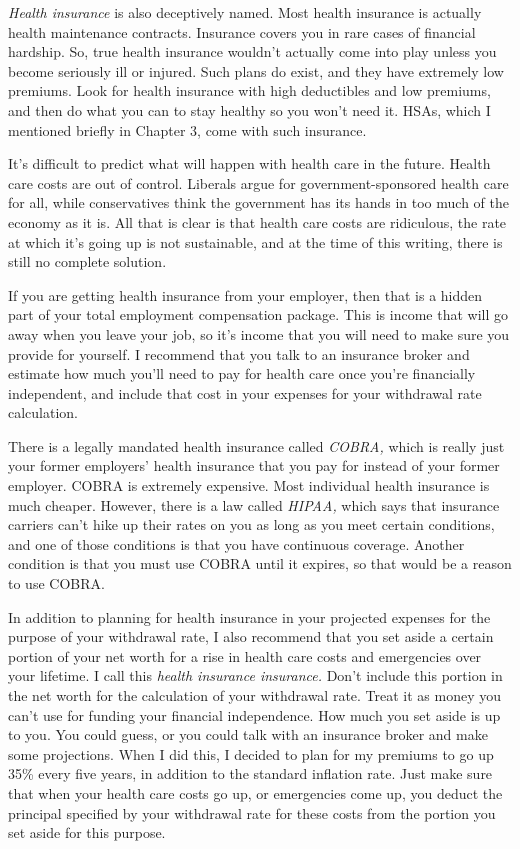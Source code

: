 \emph{Health insurance} is also deceptively named. Most health insurance is actually health maintenance contracts. Insurance covers you in rare cases of financial hardship. So, true health insurance wouldn't actually come into play unless you become seriously ill or injured. Such plans do exist, and they have extremely low premiums. Look for health insurance with high deductibles and low premiums, and then do what you can to stay healthy so you won't need it. HSAs, which I mentioned briefly in Chapter 3, come with such insurance.

It's difficult to predict what will happen with health care in the future. Health care costs are out of control. Liberals argue for government-sponsored health care for all, while conservatives think the government has its hands in too much of the economy as it is. All that is clear is that health care costs are ridiculous, the rate at which it's going up is not sustainable, and at the time of this writing, there is still no complete solution.

If you are getting health insurance from your employer, then that is a hidden part of your total employment compensation package. This is income that will go away when you leave your job, so it's income that you will need to make sure you provide for yourself. I recommend that you talk to an insurance broker and estimate how much you'll need to pay for health care once you're financially independent, and include that cost in your expenses for your withdrawal rate calculation.

There is a legally mandated health insurance called \emph{COBRA,} which is really just your former employers' health insurance that you pay for instead of your former employer. COBRA is extremely expensive. Most individual health insurance is much cheaper. However, there is a law called \emph{HIPAA,} which says that insurance carriers can't hike up their rates on you as long as you meet certain conditions, and one of those conditions is that you have continuous coverage. Another condition is that you must use COBRA until it expires, so that would be a reason to use COBRA.

In addition to planning for health insurance in your projected expenses for the purpose of your withdrawal rate, I also recommend that you set aside a certain portion of your net worth for a rise in health care costs and emergencies over your lifetime. I call this \emph{health insurance insurance.} Don't include this portion in the net worth for the calculation of your withdrawal rate. Treat it as money you can't use for funding your financial independence. How much you set aside is up to you. You could guess, or you could talk with an insurance broker and make some projections. When I did this, I decided to plan for my premiums to go up 35\% every five years, in addition to the standard inflation rate. Just make sure that when your health care costs go up, or emergencies come up, you deduct the principal specified by your withdrawal rate for these costs from the portion you set aside for this purpose.

